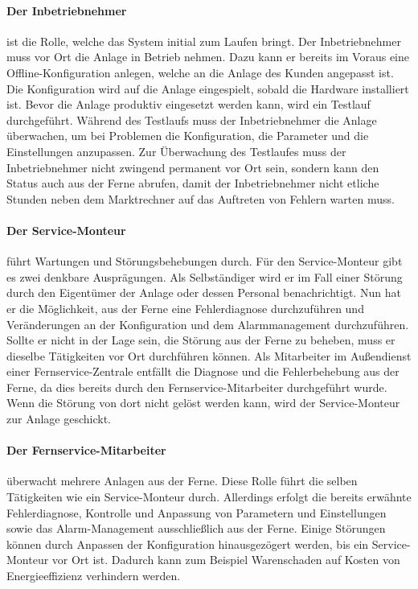 \documentclass[11pt,a4paper]{report}
\begin{document}
\paragraph{Der Inbetriebnehmer} ist die Rolle, welche das System initial zum Laufen bringt. Der Inbetriebnehmer muss vor Ort die Anlage in Betrieb nehmen. Dazu kann er bereits im Voraus eine Offline-Konfiguration anlegen, welche an die Anlage des Kunden angepasst ist. Die Konfiguration wird auf die Anlage eingespielt, sobald die Hardware installiert ist. Bevor die Anlage produktiv eingesetzt werden kann, wird ein Testlauf durchgeführt. Während des Testlaufs muss der Inbetriebnehmer die Anlage überwachen, um bei Problemen die Konfiguration, die Parameter und die Einstellungen anzupassen. Zur Überwachung des Testlaufes muss der Inbetriebnehmer nicht zwingend permanent vor Ort sein, sondern kann den Status auch aus der Ferne abrufen, damit der Inbetriebnehmer nicht etliche Stunden neben dem Marktrechner auf das Auftreten von Fehlern warten muss.

\paragraph{Der Service-Monteur} führt Wartungen und Störungsbehebungen durch. Für den Service-Monteur gibt es zwei denkbare Ausprägungen. Als Selbständiger wird er im Fall einer Störung durch den Eigentümer der Anlage oder dessen Personal benachrichtigt. Nun hat er die Möglichkeit, aus der Ferne eine Fehlerdiagnose durchzuführen und Veränderungen an der Konfiguration und dem Alarmmanagement durchzuführen. Sollte er nicht in der Lage sein, die Störung aus der Ferne zu beheben, muss er dieselbe Tätigkeiten vor Ort durchführen können. Als Mitarbeiter im Außendienst einer Fernservice-Zentrale entfällt die Diagnose und die Fehlerbehebung aus der Ferne, da dies bereits durch den Fernservice-Mitarbeiter durchgeführt wurde. Wenn die Störung von dort nicht gelöst werden kann, wird der Service-Monteur zur Anlage geschickt.

\paragraph{Der Fernservice-Mitarbeiter} überwacht mehrere Anlagen aus der Ferne. Diese Rolle führt die selben Tätigkeiten wie ein Service-Monteur durch. Allerdings erfolgt die bereits erwähnte Fehlerdiagnose, Kontrolle und Anpassung von Parametern und Einstellungen sowie das Alarm-Management ausschließlich aus der Ferne. Einige Störungen können durch Anpassen der Konfiguration hinausgezögert werden, bis ein Service-Monteur vor Ort ist. Dadurch kann zum Beispiel Warenschaden auf Kosten von Energieeffizienz verhindern werden.
\end{document}
